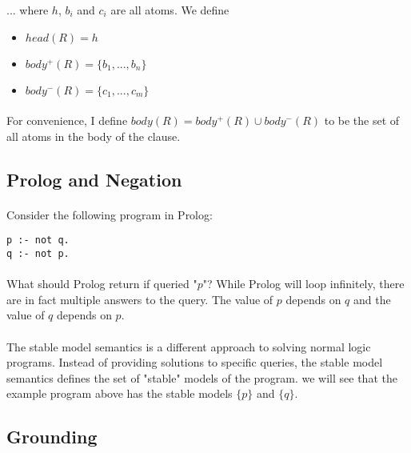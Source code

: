 \documentclass{article}
\theoremstyle{plain}
\theoremstyle{definition}
\begin{document}
\begin{multicols}{2}
\noindent ... where $h$, $b_i$ and $c_i$ are all atoms. We define 

\begin{itemize}
\item $head(R) = h$
\item $body^+(R) = \{ b_1, ..., b_n \}$
\item $body^-(R) = \{ c_1, ..., c_m \}$
\end{itemize}

\paragraph{} For convenience, I define $body(R) = body^+(R) \cup body^-(R)$ to be the set of all atoms in the body of the clause.

\subsection{Prolog and Negation}

\paragraph{} Consider the following program in Prolog:

\begin{lstlisting}
p :- not q.
q :- not p.
\end{lstlisting}

\paragraph{} What should Prolog return if queried "$p$"? While Prolog will loop infinitely, there are in fact multiple answers to the query. The value of $p$ depends on $q$ and the value of $q$ depends on $p$.

\paragraph{} The stable model semantics\cite{gelfond88} is a different approach to solving normal logic programs. Instead of providing solutions to specific queries, the stable model semantics defines the set of "stable" models of the program. we will see that the example program above has the stable models $\{p\}$ and $\{q\}$.

\subsection{Grounding}


\end{multicols}
\end{document}
